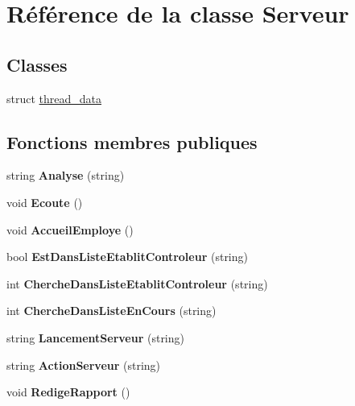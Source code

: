 \hypertarget{class_serveur}{\section{Référence de la classe Serveur}
\label{class_serveur}
}
\subsection*{Classes}
\begin{DoxyCompactItemize}
\item 
struct \hyperlink{struct_serveur_1_1thread__data}{thread\-\_\-data}
\end{DoxyCompactItemize}
\subsection*{Fonctions membres publiques}
\begin{DoxyCompactItemize}
\item 
\hypertarget{class_serveur_a770b3b736207e2e0f4e99a44e6dbfbcf}{string {\bfseries Analyse} (string)}\label{class_serveur_a770b3b736207e2e0f4e99a44e6dbfbcf}

\item 
\hypertarget{class_serveur_af4e624ed5818b967f99c5abbc966212c}{void {\bfseries Ecoute} ()}\label{class_serveur_af4e624ed5818b967f99c5abbc966212c}

\item 
\hypertarget{class_serveur_a4ebd92717a7ee46a363f5c1816a99f56}{void {\bfseries Accueil\-Employe} ()}\label{class_serveur_a4ebd92717a7ee46a363f5c1816a99f56}

\item 
\hypertarget{class_serveur_a5950c36f0775a3c5b01f22ceaa443171}{bool {\bfseries Est\-Dans\-Liste\-Etablit\-Controleur} (string)}\label{class_serveur_a5950c36f0775a3c5b01f22ceaa443171}

\item 
\hypertarget{class_serveur_a1d08a6af05112c72e679f9e2c7223850}{int {\bfseries Cherche\-Dans\-Liste\-Etablit\-Controleur} (string)}\label{class_serveur_a1d08a6af05112c72e679f9e2c7223850}

\item 
\hypertarget{class_serveur_a397592d70951ac24f178a2003bd369de}{int {\bfseries Cherche\-Dans\-Liste\-En\-Cours} (string)}\label{class_serveur_a397592d70951ac24f178a2003bd369de}

\item 
\hypertarget{class_serveur_a5b54a380c06fa431c7adb18b6b7b9eda}{string {\bfseries Lancement\-Serveur} (string)}\label{class_serveur_a5b54a380c06fa431c7adb18b6b7b9eda}

\item 
\hypertarget{class_serveur_abc20e0793f7907e8d8b1596f6046aa47}{string {\bfseries Action\-Serveur} (string)}\label{class_serveur_abc20e0793f7907e8d8b1596f6046aa47}

\item 
\hypertarget{class_serveur_a36263ad96b1619d079ec49c54773496f}{void {\bfseries Redige\-Rapport} ()}\label{class_serveur_a36263ad96b1619d079ec49c54773496f}

\end{DoxyCompactItemize}
